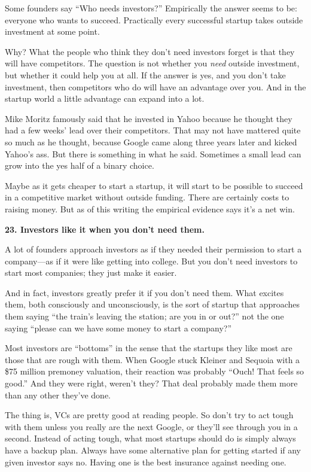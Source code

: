 \documentclass[12pt]{book}
\begin{document}
Some founders say ``Who needs investors?'' Empirically the answer seems
to be: everyone who wants to succeed. Practically every successful
startup takes outside investment at some point.

Why? What the people who think they don't need investors forget is that
they will have competitors. The question is not whether you \emph{need}
outside investment, but whether it could help you at all. If the answer
is yes, and you don't take investment, then competitors who do will have
an advantage over you. And in the startup world a little advantage can
expand into a lot.

Mike Moritz famously said that he invested in Yahoo because he thought
they had a few weeks' lead over their competitors. That may not have
mattered quite so much as he thought, because Google came along three
years later and kicked Yahoo's ass. But there is something in what he
said. Sometimes a small lead can grow into the yes half of a binary
choice.

Maybe as it gets cheaper to start a startup, it will start to be
possible to succeed in a competitive market without outside funding.
There are certainly costs to raising money. But as of this writing the
empirical evidence says it's a net win.

\textbf{23. Investors like it when you don't need them.}

A lot of founders approach investors as if they needed their permission
to start a company---as if it were like getting into college. But you
don't need investors to start most companies; they just make it easier.

And in fact, investors greatly prefer it if you don't need them. What
excites them, both consciously and unconsciously, is the sort of startup
that approaches them saying ``the train's leaving the station; are you
in or out?'' not the one saying ``please can we have some money to start
a company?''

Most investors are ``bottoms'' in the sense that the startups they like
most are those that are rough with them. When Google stuck Kleiner and
Sequoia with a \$75 million premoney valuation, their reaction was
probably ``Ouch! That feels so good.'' And they were right, weren't
they? That deal probably made them more than any other they've done.

The thing is, VCs are pretty good at reading people. So don't try to act
tough with them unless you really are the next Google, or they'll see
through you in a second. Instead of acting tough, what most startups
should do is simply always have a backup plan. Always have some
alternative plan for getting started if any given investor says no.
Having one is the best insurance against needing one.
\end{document}
